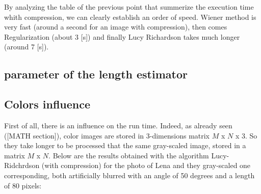By analyzing the table of the previous point that summerize the execution time whith compression, we can clearly establish an order of speed. Wiener method is very fast (around a second for an image with compression), then comes Regularization (about 3 [s]) and finally Lucy Richardson takes much longer (around 7 [s]).



\subsection{parameter of the length estimator}


\subsection{Colors influence}

First of all, there is an influence on the run time. Indeed, as already seen ([MATH section]), color images are stored in 3-dimensions matrix $M$ x $N$ x $3$. So they take longer to be processed that the same gray-scaled image, stored in a matrix $M$ x $N$.
Below are the results obtained with the algorithm Lucy-Ridchrdson (with compression) for the photo of Lena and they gray-scaled one corresponding, both artificially blurred with an angle of 50 degrees and a length of 80 pixels:


 

